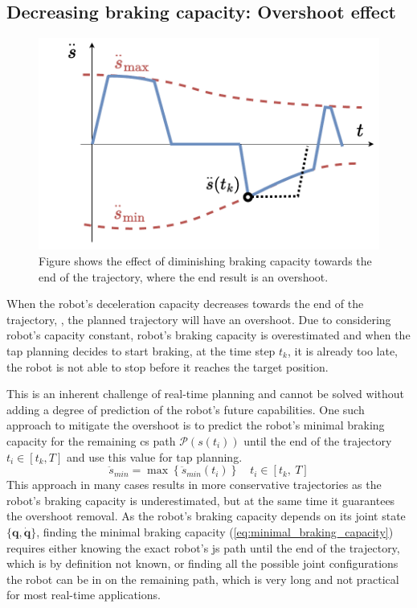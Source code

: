 \subsection{Decreasing braking capacity: Overshoot effect} 
\label{ch:overshoot}
\begin{figure}
    \centering
    \includegraphics[width=\linewidth]{Papers/imgs/overshoot_expl.pdf}
    \caption{Figure shows the effect of diminishing braking capacity towards the end of the trajectory, where the end result is an overshoot. }
    \label{fig:overshoot_expl}
\end{figure}
When the robot's deceleration capacity decreases towards the end of the trajectory, , the planned trajectory will have an overshoot. Due to considering robot's capacity constant, robot's braking capacity is overestimated and when the \gls{tap} planning decides to start braking, at the time step $t_k$, it is already too late, the robot is not able to stop before it reaches the target position. 

This is an inherent challenge of real-time planning and cannot be solved without adding a degree of prediction of the robot's future capabilities. One such approach to mitigate the overshoot is to predict the robot's minimal braking capacity for the remaining \gls{cs} path $\mathscr{P}(s(t_i))$ until the end of the trajectory $ t_i \in \left[t_k, T\right]$ and use this value for \gls{tap} planning.
\begin{equation}
    \ddot{s}_{min} = \max \left\{\ddot{s}_{min}(t_i)\right\} \quad t_i \in \left[t_k ,~ T\right]
\label{eq:minimal_braking_capacity}
\end{equation}
This approach in many cases results in more conservative trajectories as the robot's braking capacity is underestimated, but at the same time it guarantees the overshoot removal. As the robot's braking capacity depends on its joint state $\{\bm{q},\dot{\bm{q}}\}$, finding the minimal braking capacity (\ref{eq:minimal_braking_capacity}) requires either knowing the exact robot's \gls{js} path until the end of the trajectory, which is by definition not known, or finding all the possible joint configurations the robot can be in on the remaining path, which is very long and not practical for most real-time applications.

